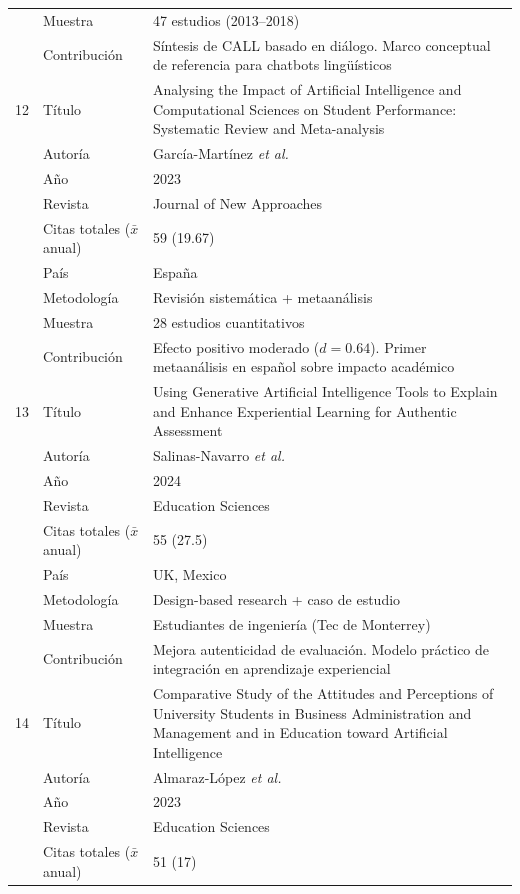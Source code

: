 \documentclass[spanish]{textolivre}
\begin{document}
{\begin{longtable}{@{}p{0.2cm}p{3cm}p{10cm}@{}}
  & Muestra & 47 estudios (2013--2018) \\
  & Contribución & Síntesis de CALL basado en diálogo. Marco conceptual de referencia para chatbots lingüísticos\\
\midrule
 12 & Título  & Analysing the Impact of Artificial Intelligence and Computational Sciences on Student Performance: Systematic Review and Meta-analysis\\
  & Autoría & García-Martínez \textit{et al.}\\
  & Año     & 2023\\
  & Revista & Journal of New Approaches  \\
  & Citas totales ($\bar{x}$ anual) & 59 (19.67) \\
  & País & España \\
  & Metodología &  Revisión sistemática + metaanálisis\\
  & Muestra & 28 estudios cuantitativos \\
  & Contribución & Efecto positivo moderado ($d = 0.64$). Primer metaanálisis en español sobre impacto académico\\
\midrule
13 & Título  & Using Generative Artificial Intelligence Tools to Explain and Enhance Experiential Learning for Authentic Assessment\\
  & Autoría & Salinas-Navarro \textit{et al.}\\
  & Año     & 2024\\
  & Revista & Education Sciences\\
  & Citas totales ($\bar{x}$ anual) & 55 (27.5)\\
  & País & UK, Mexico \\
  & Metodología & Design-based research + caso de estudio \\
  & Muestra &  Estudiantes de ingeniería (Tec de Monterrey)\\
  & Contribución & Mejora autenticidad de evaluación. Modelo práctico de integración en aprendizaje experiencial\\
\midrule
14 & Título  & Comparative Study of the Attitudes and Perceptions of University Students in Business Administration and Management and in Education toward Artificial Intelligence  \\
  & Autoría & Almaraz-López \textit{et al.} \\
  & Año     & 2023\\
  & Revista & Education Sciences\\
  & Citas totales ($\bar{x}$ anual) & 51 (17)\\

\end{longtable}}
\end{document}
